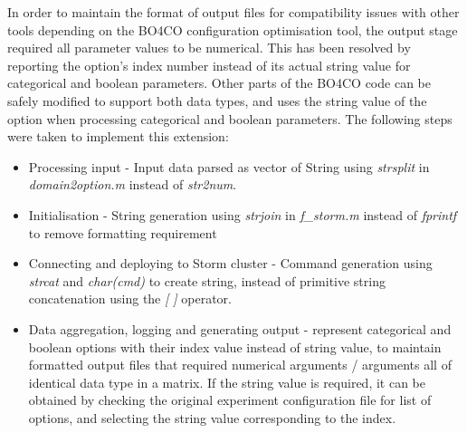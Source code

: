 In order to maintain the format of output files for compatibility issues with other tools depending on the BO4CO configuration optimisation tool, the output stage required all parameter values to be numerical. This has been resolved by reporting the option's index number instead of its actual string value for categorical and boolean parameters. Other parts of the BO4CO code can be safely modified to support both data types, and uses the string value of the option when processing categorical and boolean parameters. The following steps were taken to implement this extension:
\begin{itemize}
\item Processing input - Input data parsed as vector of String using \textit{strsplit} in \textit{domain2option.m} instead of \textit{str2num}.
\item Initialisation - String generation using \textit{strjoin} in \textit{f\_storm.m} instead of \textit{fprintf} to remove formatting requirement
\item Connecting and deploying to Storm cluster - Command generation using \textit{strcat} and \textit{char(cmd)} to create string, instead of primitive string concatenation using the \textit{[ ]} operator.
\item Data aggregation, logging and generating output -  represent categorical and boolean options with their index value instead of string value, to maintain formatted output files that required numerical arguments / arguments all of identical data type in a matrix. If the string value is required, it can be obtained by checking the original experiment configuration file for list of options, and selecting the string value corresponding to the index.
\end{itemize}

\newpage

